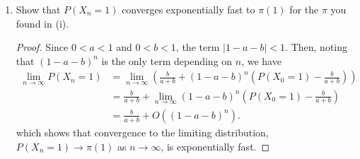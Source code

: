 \documentclass[oneside,reqno]{amsart}
\theoremstyle{definition}
\begin{document}
\begin{enumerate}
\begin{proof}[Proof (by induction on $n$)]
The base case $n=0$ holds since 
\begin{align*}
	P(X_0 = 1) &= \frac{b}{a+b} + (1-a-b)^0 \left( P(X_0 = 1)- \frac{b}{a+b}\right) \\
					 &= \frac{b}{a+b} + P(X_0 = 1)- \frac{b}{a+b} = P(X_0 = 1),
\end{align*} 
and the base case $n=1$ holds since
\begin{align*}
	P(X_1 = 1) &= \sum_i P(X_{1} = 1 \mid X_0 = i) P(X_0 = i) \\
					&= P(X_{1} = 1 \mid X_0 = 1) P(X_0 = 1) +  P(X_{1} = 1 \mid X_0 = 2) P(X_0 = 2) \\
					&= (1-a) P(X_0 = 1) +  b (1- P(X_0 = 1) )\\
					&=\frac{b}{a+b} + (1-a-b) \left(P(X_0 = 1)- \frac{b}{a+b}\right)
\end{align*}
where the last equality uses the same logic as in $(ii)$.
\par
Assume the claim is true for any $n$. We want to show that the result is also true for $n+1$. From (i), we know that 
\[
	P(X_{n+1} = 1) = \frac{b}{a+b} + (1-a-b)\left( P(X_n = 1)- \frac{b}{a+b}\right).
\]
Substituting in for $P(X_n=1)$ gives 
\begin{align*}
	P(X_{n+1} = 1) &= \frac{b}{a+b} + (1-a-b)\left( \left((1-a-b)^n \left(P(X_0 = 1)- \frac{b}{a+b}\right)\right) - \frac{b}{a+b}\right) \\
	&= \frac{b}{a+b} + (1-a-b)^{n+1}\left( P(X_0 = 1)- \frac{b}{a+b}\right).
\end{align*}	
Shifting the indices back one period gives
\[
	P(X_n = 1) = \frac{b}{a+b} + (1-a-b)^n \left( P(X_0 = 1)- \frac{b}{a+b}\right).
\]
\end{proof}

\item
Show that $P(X_n=1)$ converges exponentially fast to $\pi(1)$ for the $\pi$ you found in (i).

\begin{proof}
Since $0<a<1$ and $0<b<1$, the term $|1-a-b| < 1$. Then, noting that $(1-a-b)^n$ is the only term depending on $n$, we have
\begin{align*}
	\lim_{n \to \infty} P(X_n = 1) &= \lim_{n \to \infty}\left( \frac{b}{a+b} + (1-a-b)^n \left(P(X_0 = 1)- \frac{b}{a+b}\right)\right) \\
	&=  \frac{b}{a+b} + \lim_{n \to \infty} (1-a-b)^n  \left( P(X_0 = 1) - \frac{b}{a+b} \right) \\	
		&=  \frac{b}{a+b} + O((1-a-b)^{n}). 
\end{align*}
which shows that convergence to the limiting distribution, $P(X_n=1) \to \pi(1)$ as $n \to \infty$, is exponentially fast.
\end{proof}
\end{enumerate}
\end{document}
